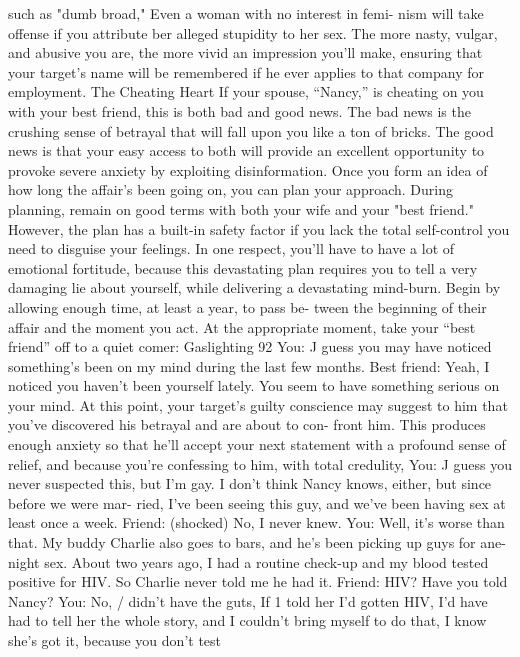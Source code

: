 \documentclass{book}
\begin{document}
such as "dumb broad," Even a woman with no interest in femi- 
nism will take offense if you attribute ber alleged stupidity to 
her sex. The more nasty, vulgar, and abusive you are, the more 
vivid an impression you'll make, ensuring that your target's 
name will be remembered if he ever applies to that company for 
employment. 
The Cheating Heart 
If your spouse, “Nancy,” is cheating on you with your best 
friend, this is both bad and good news. The bad news is the 
crushing sense of betrayal that will fall upon you like a ton of 
bricks. The good news is that your easy access to both will 
provide an excellent opportunity to provoke severe anxiety by 
exploiting disinformation. Once you form an idea of how long 
the affair's been going on, you can plan your approach. 
During planning, remain on good terms with both your wife 
and your "best friend." However, the plan has a built-in safety 
factor if you lack the total self-control you need to disguise your 
feelings. In one respect, you'll have to have a lot of emotional 
fortitude, because this devastating plan requires you to tell a 
very damaging lie about yourself, while delivering a devastating 
mind-burn. 
Begin by allowing enough time, at least a year, to pass be- 
tween the beginning of their affair and the moment you act. At 
the appropriate moment, take your “best friend” off to a quiet 
comer:  Gaslighting 
92 
You: J guess you may have noticed something's been on my 
mind during the last few months. 
Best friend: Yeah, I noticed you haven't been yourself lately. 
You seem to have something serious on your mind. 
At this point, your target's guilty conscience may suggest to 
him that you've discovered his betrayal and are about to con- 
front him. This produces enough anxiety so that he'll accept 
your next statement with a profound sense of relief, and 
because you're confessing to him, with total credulity, 
You: J guess you never suspected this, but I'm gay. I don't 
think Nancy knows, either, but since before we were mar- 
ried, I've been seeing this guy, and we've been having sex 
at least once a week. 
Friend: (shocked) No, I never knew. 
You: Well, it's worse than that. My buddy Charlie also goes to 
bars, and he's been picking up guys for ane-night sex. 
About two years ago, I had a routine check-up and my 
blood tested positive for HIV. So Charlie never told me he 
had it. 
Friend: HIV? Have you told Nancy? 
You: No, / didn't have the guts, If 1 told her I'd gotten HIV, I'd 
have had to tell her the whole story, and I couldn't bring 
myself to do that, I know she's got it, because you don't test 
\end{document}
